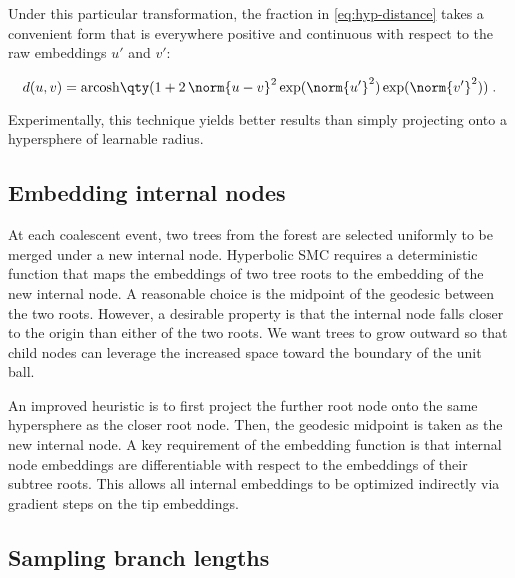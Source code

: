 \documentclass{article}
\DeclareMathOperator{\arcosh}{arcosh}
\begin{document}
Under this particular transformation, the fraction in \ref{eq:hyp-distance} takes a convenient form that is everywhere positive and continuous with respect to the raw embeddings $u'$ and $v'$:


\begin{equation}
  d(u, v) = \arcosh\!\qty(1 + 2 \, \norm{u - v}^2 \exp(\norm{u'}^2) \exp(\norm{v'}^2)) \; .
\end{equation}


Experimentally, this technique yields better results than simply projecting onto a hypersphere of learnable radius.




\subsection{Embedding internal nodes}


At each coalescent event, two trees from the forest are selected uniformly to be merged under a new internal node. Hyperbolic SMC requires a deterministic function that maps the embeddings of two tree roots to the embedding of the new internal node. A reasonable choice is the midpoint of the geodesic between the two roots. However, a desirable property is that the internal node falls closer to the origin than either of the two roots. We want trees to grow outward so that child nodes can leverage the increased space toward the boundary of the unit ball.

An improved heuristic is to first project the further root node onto the same hypersphere as the closer root node. Then, the geodesic midpoint is taken as the new internal node. A key requirement of the embedding function is that internal node embeddings are differentiable with respect to the embeddings of their subtree roots. This allows all internal embeddings to be optimized indirectly via gradient steps on the tip embeddings.




\subsection{Sampling branch lengths}
\end{document}
